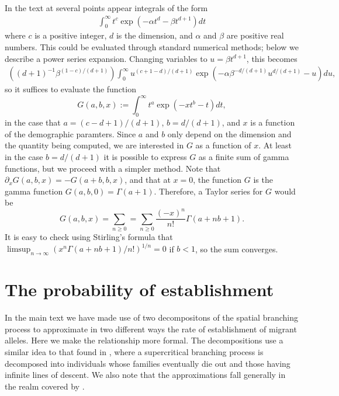 \documentclass{article}
\begin{document}
In the text at several points appear integrals of the form
\begin{align}
  \int_0^\infty t^c \exp \left( - \alpha t^d - \beta t^{d+1} \right) dt 
\end{align}
where $c$ is a positive integer, $d$ is the dimension, and $\alpha$ and $\beta$ are positive real numbers.
This could be evaluated through standard numerical methods; below we describe a power series expansion.
Changing variables to $u = \beta t^{d+1}$, this becomes
\begin{align}
    \left( (d+1)^{-1} \beta^{ (1-c)/(d+1) } \right) \int_0^\infty u^{(c+1-d)/(d+1)} \exp\left( - \alpha \beta^{-d/(d+1)} u^{d/(d+1)} - u \right) du ,
\end{align}
so it suffices to evaluate the function
\begin{equation}
    G(a,b,x) := \int_0^\infty  t^a \exp\left( -x t^b - t \right) dt ,
\end{equation}
in the case that $a=(c-d+1)/(d+1)$, $b=d/(d+1)$, and $x$ is a function of the demographic paramters.
Since $a$ and $b$ only depend on the dimension and the quantity being computed,
we are interested in $G$ as a function of $x$.
At least in the case $b=d/(d+1)$ it is possible to express $G$ as a finite sum of gamma functions,
but we proceed with a simpler method.
Note that $\partial_x G(a,b,x) = -G(a+b,b,x)$,
and that at $x=0$, the function $G$ is the gamma function $G(a,b,0) = \Gamma(a+1)$.
Therefore, a Taylor series for $G$ would be
\[
    G(a,b,x) = \sum_{n \ge 0} = \sum_{n \ge 0} \frac{(-x)^n}{n!} \Gamma(a+nb+1) .
\]
It is easy to check using Stirling's formula that $\limsup_{n \to \infty} ( x^n \Gamma(a+nb+1)/n! )^{1/n} = 0$
if $b<1$, so the sum converges.


\section{The probability of establishment}
\label{ss:prob_estab}

In the main text we have made use of two decompositons of the spatial branching process
to approximate in two different ways the rate of establishment of migrant alleles.
Here we make the relationship more formal.
The decompositions use a similar idea to that found in \citep[section D.12]{athreyaney},
where a supercritical branching process is decomposed into individuals whose families eventually die out
and those having infinite lines of descent.
We also note that the approximations fall generally in the realm covered by \citet{aldouspoissonclumping}.
\end{document}
